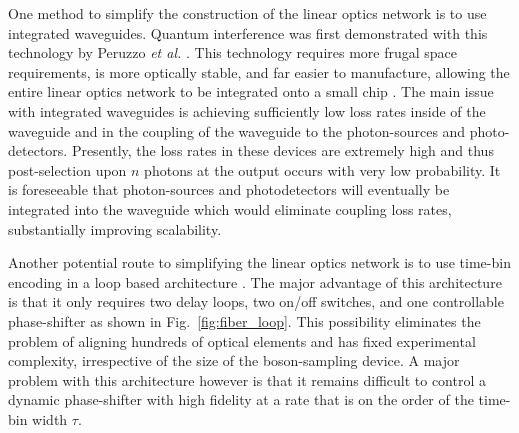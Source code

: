 \documentclass[aps,pra,twocolumn,amsmath,amssymb,nofootinbib,superscriptaddress]{revtex4}
\begin{document}
One method to simplify the construction of the linear optics network is to use integrated waveguides. Quantum interference was first demonstrated with this technology by Peruzzo \emph{et al.} \cite{bib:peruzzo2011multimode}. This technology requires more frugal space requirements, is more optically stable, and far easier to manufacture, allowing the entire linear optics network to be integrated onto a small chip \cite{bib:Politi02052008, bib:matthews2009, bib:Politi04092009}. The main issue with integrated waveguides is achieving sufficiently low loss rates inside of the waveguide and in the coupling of the waveguide to the photon-sources and photo-detectors. Presently, the loss rates in these devices are extremely high and thus post-selection upon $n$ photons at the output occurs with very low probability. It is foreseeable that photon-sources and photodetectors will eventually be integrated into the waveguide which would eliminate coupling loss rates, substantially improving scalability.   

Another potential route to simplifying the linear optics network is to use time-bin encoding in a loop based architecture \cite{bib:motes2014scalable}. The major advantage of this architecture is that it only requires two delay loops, two on/off switches, and one controllable phase-shifter as shown in Fig.~\ref{fig:fiber_loop}. This possibility eliminates the problem of aligning hundreds of optical elements and has fixed experimental complexity, irrespective of the size of the boson-sampling device. A major problem with this architecture however is that it remains difficult to control a dynamic phase-shifter with high fidelity at a rate that is on the order of the time-bin width $\tau$.
\end{document}
